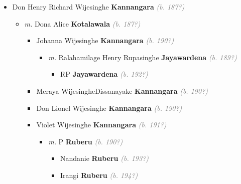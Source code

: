 \documentclass[10pt, openany]{book}
\begin{document}
\begin{itemize}
{\begin{itemize}
{\begin{itemize}
{\begin{itemize}
{\begin{itemize}
{\begin{itemize}
{\begin{itemize}
{\begin{itemize}
{  }
\item{Don Wilson \textbf{Attygalle} \textcolor{gray}{\textit{(b. 193?)}}
  }
\end{itemize}}
\end{itemize}
 }
\end{itemize}}
\end{itemize}
  }
\item{Don Henry Richard Wijesinghe \textbf{Kannangara} \textcolor{gray}{\textit{(b. 187?)}}
\begin{itemize}
\item{\textit{m.} Dona Alice \textbf{Kotalawala} \textcolor{gray}{\textit{(b. 187?)}}   \label{couple:00000404:00000479} \begin{itemize}
\item{Johanna Wijesinghe \textbf{Kannangara} \textcolor{gray}{\textit{(b. 190?)}}
\begin{itemize}
\item{\textit{m.} Ralahamilage Henry Rupasinghe \textbf{Jayawardena} \textcolor{gray}{\textit{(b. 189?)}}   \label{couple:00000358:00000440} \begin{itemize}
\item{RP \textbf{Jayawardena} \textcolor{gray}{\textit{(b. 192?)}}
 }
\end{itemize}}
\end{itemize}
  }
\item{Meraya WijesingheDissanayake \textbf{Kannangara} \textcolor{gray}{\textit{(b. 190?)}}
  }
\item{Don Lionel Wijesinghe \textbf{Kannangara} \textcolor{gray}{\textit{(b. 190?)}}
   }
\item{Violet Wijesinghe \textbf{Kannangara} \textcolor{gray}{\textit{(b. 191?)}}
\begin{itemize}
\item{\textit{m.} P \textbf{Ruberu} \textcolor{gray}{\textit{(b. 190?)}}   \label{couple:00000462:00002639} \begin{itemize}
\item{Nandanie \textbf{Ruberu} \textcolor{gray}{\textit{(b. 193?)}}
 }
\item{Irangi \textbf{Ruberu} \textcolor{gray}{\textit{(b. 194?)}}
}
\end{itemize}}
\end{itemize}}
\end{itemize}}
\end{itemize}}
\end{itemize}}
\end{itemize}}
\end{itemize}}
\end{itemize}
\end{document}
